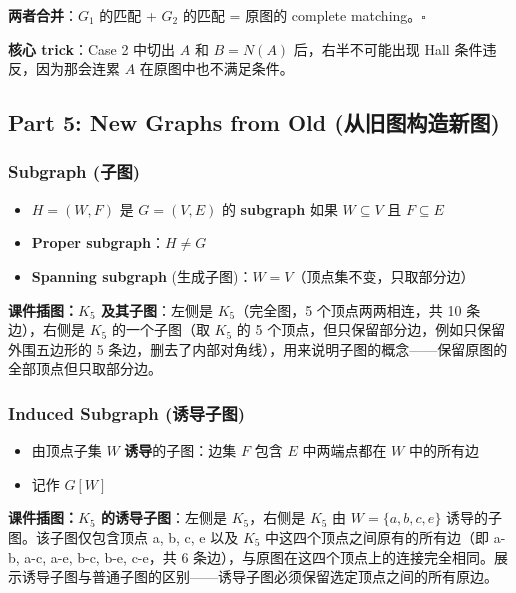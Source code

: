 \documentclass[10pt,a4paper,openany]{ctexbook}
\theoremstyle{definition}
\theoremstyle{remark}
\renewenvironment{quote}
  {\list{}{\leftmargin=1em\rightmargin=0pt\topsep=0.5pt\partopsep=0pt}\item[]}
  {\endlist}
\begin{document}
\textbf{两者合并}：$G_1$ 的匹配 + $G_2$ 的匹配 = 原图的 complete matching。$\square$
\begin{quote}
\textbf{核心 trick}：Case 2 中切出 $A$ 和 $B = N(A)$ 后，右半不可能出现 Hall 条件违反，因为那会连累 $A$ 在原图中也不满足条件。

\end{quote}
\vspace{-2pt}

\subsection{Part 5: New Graphs from Old (从旧图构造新图)}

\subsubsection{Subgraph (子图)}

\begin{itemize}
\item $H = (W, F)$ 是 $G = (V, E)$ 的 \textbf{subgraph} 如果 $W \subseteq V$ 且 $F \subseteq E$
\item \textbf{Proper subgraph}：$H \neq G$
\item \textbf{Spanning subgraph} (生成子图)：$W = V$（顶点集不变，只取部分边）

\end{itemize}

\textbf{课件插图：$K_5$ 及其子图}：左侧是 $K_5$（完全图，5 个顶点两两相连，共 10 条边），右侧是 $K_5$ 的一个子图（取 $K_5$ 的 5 个顶点，但只保留部分边，例如只保留外围五边形的 5 条边，删去了内部对角线），用来说明子图的概念——保留原图的全部顶点但只取部分边。
\subsubsection{Induced Subgraph (诱导子图)}

\begin{itemize}
\item 由顶点子集 $W$ \textbf{诱导}的子图：边集 $F$ 包含 $E$ 中两端点都在 $W$ 中的所有边
\item 记作 $G[W]$

\end{itemize}

\textbf{课件插图：$K_5$ 的诱导子图}：左侧是 $K_5$，右侧是 $K_5$ 由 $W = \{a, b, c, e\}$ 诱导的子图。该子图仅包含顶点 a, b, c, e 以及 $K_5$ 中这四个顶点之间原有的所有边（即 a-b, a-c, a-e, b-c, b-e, c-e，共 6 条边），与原图在这四个顶点上的连接完全相同。展示诱导子图与普通子图的区别——诱导子图必须保留选定顶点之间的所有原边。
\end{document}
